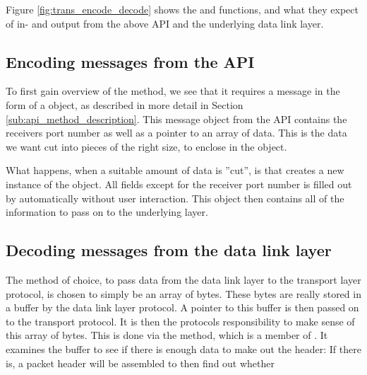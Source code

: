 Figure \ref{fig:trans_encode_decode} shows the  and  functions, and what they expect of in- and output from the above API and the underlying data link layer.


\subsection{Encoding messages from the API}
To first gain overview of the  method, we see that it requires a message in the form of a  object, as described in more detail in Section \ref{sub:api_method_description}. This message object from the API contains the receivers port number as well as a pointer to an array of data. This is the data we want cut into pieces of the right size, to enclose in the  object.

What happens, when a suitable amount of data is ''cut'', is that  creates a new instance of the  object. All fields except for the receiver port number is filled out by  automatically without user interaction. This object then contains all of the information to pass on to the underlying layer.


\subsection{Decoding messages from the data link layer}
The method of choice, to pass data from the data link layer to the transport layer protocol, is chosen to simply be an array of bytes. These bytes are really stored in a buffer by the data link layer protocol. A pointer to this buffer is then passed on to the transport protocol. It is then the protocols responsibility to make sense of this array of bytes. This is done via the  method, which is a member of . It examines the buffer to see if there is enough data to make out the header: If there is, a packet header will be assembled to then find out whether


%
%
%
%
%
%
%
%
%
%